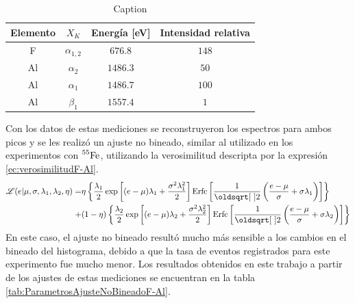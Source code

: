 \begin{table}[h]
\centering
\begin{tabular}{@{}cccc@{}}
\toprule
Elemento    &   $X_{K}$         &   Energía [eV]    &   Intensidad relativa \\ \hline \hline
F           &   $\alpha_{1,2}$  &   $676.8$         &   $148$               \\
Al          &   $\alpha_{2}$    &   $1486.3$        &   $50$                \\
Al          &   $\alpha_{1}$    &   $1486.7$        &   $100$               \\
Al          &   $\beta_{1}$     &   $1557.4$        &   $1$                 \\ \bottomrule
\end{tabular}
\caption{\footnotesize{Caption}}
\label{tab:EnergiasFluorescenciaFAl}
\end{table}
Con los datos de estas mediciones se reconstruyeron los espectros para ambos picos y se les realizó un ajuste no bineado, similar al utilizado en los experimentos con $\prescript{55}{}{\mbox{Fe}}$, utilizando la verosimilitud descripta por la expresión \eqref{ec:verosimilitudF-Al}.
\begin{align}
    \Lagr(e|\mu,
            \sigma,
            \lambda_{1},
            \lambda_{2},
            \eta)
    = &
    \eta
    \left\{
        \frac{\lambda_{1}}{2}
        \exp\left[
                (e-\mu)\lambda_{1} + \frac{\sigma^{2}\lambda_{1}^{2}}{2}
            \right]
        \mbox{Erfc}
        \left[
            \frac{1}{\sqrt{2}}
            \left(
                \frac{e - \mu}{\sigma}
                +\sigma\lambda_{1}
            \right)
        \right] \right\} \nonumber
        \\
        + &
        (1-\eta)
        \left\{
        \frac{\lambda_{2}}{2}
        \exp
            \left[
                 (e - \mu)\lambda_{2}
                 + \frac{\sigma^{2}\lambda_{2}^{2}}{2}
            \right]
        \mbox{Erfc}
        \left[
            \frac{1}{\sqrt{2}}
            \left(
                \frac{e - \mu}{\sigma}
                +\sigma\lambda_{2}
            \right)
        \right]
    \right\}
        \label{ec:verosimilitudF-Al}
\end{align}
En este caso, el ajuste no bineado resultó mucho más sensible a los cambios en el bineado del histograma, debido a que la tasa de eventos registrados para este experimento fue mucho menor. Los resultados obtenidos en este trabajo a partir de los ajustes de estas mediciones se encuentran en la tabla \ref{tab:ParametrosAjusteNoBineadoF-Al}.
